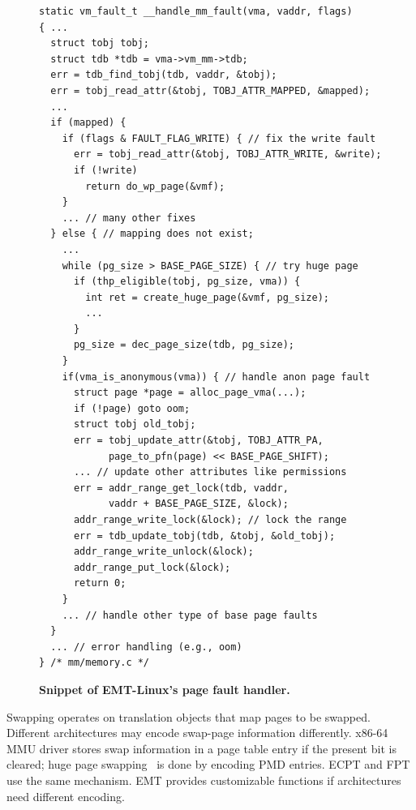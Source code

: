 \begin{figure}[tbp]
	\centering
	\begin{verbatim}
static vm_fault_t __handle_mm_fault(vma, vaddr, flags)
{ ...
  struct tobj tobj;
  struct tdb *tdb = vma->vm_mm->tdb;
  err = tdb_find_tobj(tdb, vaddr, &tobj);
  err = tobj_read_attr(&tobj, TOBJ_ATTR_MAPPED, &mapped);
  ...
  if (mapped) {
    if (flags & FAULT_FLAG_WRITE) { // fix the write fault
      err = tobj_read_attr(&tobj, TOBJ_ATTR_WRITE, &write);
      if (!write)
        return do_wp_page(&vmf);
    }
    ... // many other fixes
  } else { // mapping does not exist; 
    ...
    while (pg_size > BASE_PAGE_SIZE) { // try huge page
      if (thp_eligible(tobj, pg_size, vma)) {
        int ret = create_huge_page(&vmf, pg_size);
        ...
      }
      pg_size = dec_page_size(tdb, pg_size);
    }
    if(vma_is_anonymous(vma)) { // handle anon page fault
      struct page *page = alloc_page_vma(...);
      if (!page) goto oom;
      struct tobj old_tobj;
      err = tobj_update_attr(&tobj, TOBJ_ATTR_PA,
            page_to_pfn(page) << BASE_PAGE_SHIFT);  
      ... // update other attributes like permissions
      err = addr_range_get_lock(tdb, vaddr, 
            vaddr + BASE_PAGE_SIZE, &lock);
      addr_range_write_lock(&lock); // lock the range
      err = tdb_update_tobj(tdb, &tobj, &old_tobj);
      addr_range_write_unlock(&lock);
      addr_range_put_lock(&lock);
      return 0;
    }
    ... // handle other type of base page faults
  }
  ... // error handling (e.g., oom)
} /* mm/memory.c */
\end{verbatim}
\caption{\bf Snippet of EMT-Linux's page fault handler.}
\label{emt:fig:pfh-example}
\end{figure}

Swapping operates on translation objects that map pages to be swapped. %
Different architectures may encode swap-page information differently.
x86-64 MMU driver stores swap information in a page table entry if
	the present bit is cleared; %
huge page swapping~\cite{linux:hugepage-swap} is done
	by encoding PMD entries.
ECPT and FPT use the same mechanism.
EMT provides customizable functions if architectures need different encoding.

